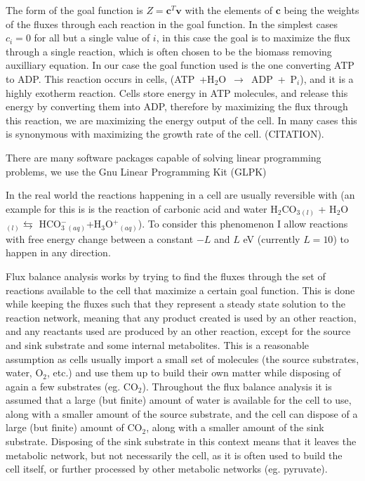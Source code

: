 \documentclass[10pt,a4paper]{article}
\begin{document}
	The form of the goal function is $Z=\mathbf{c}^T \mathbf{v}$ with the elements of $\mathbf{c}$ being the weights of the fluxes through each reaction in the goal function. In the simplest cases $c_i=0$ for all but a single value of $i$, in this case the goal is to maximize the flux through a single reaction, which is often chosen to be the biomass removing auxilliary equation. In our case the goal function used is the one converting ATP to ADP. This reaction occurs in cells, (ATP~+H$_2$O~$\rightarrow$~ADP~+~P$_i$), and it is a highly exotherm reaction. Cells store energy in ATP molecules, and release this energy by converting them into ADP, therefore by maximizing the flux through this reaction, we are maximizing the energy output of the cell. In many cases this is synonymous with maximizing the growth rate of the cell. (CITATION). 
	
	There are many software packages capable of solving linear programming problems, we use the Gnu Linear Programming Kit (GLPK) \cite{glpk}


	In the real world the reactions happening in a cell are usually reversible with (an example for this is is the reaction of carbonic acid and water H$_2$CO$_3$$_{(l)}$ + H$_2$O$_{(l)} \leftrightarrows$ HCO$^-_3$$_{(aq)}$+H$_3$O$^+$$_{(aq)}$). To consider this phenomenon I allow reactions with free energy change between a constant $-L$ and $L$ eV (currently $L=10$) to happen in any direction. 
	
	Flux balance analysis works by trying to find the fluxes through the set of reactions available to the cell that maximize a certain goal function. This is done while keeping the fluxes such that they represent a steady state solution to the reaction network, meaning that any product created is used by an other reaction, and any reactants used are produced by an other reaction, except for the source and sink substrate and some internal metabolites. This is a reasonable assumption as cells usually import a small set of molecules (the source substrates, water, O$_2$, etc.) and use them up to build their own matter while disposing of again a few substrates (eg. CO$_2$). Throughout the flux balance analysis it is assumed that a large (but finite) amount of water is available for the cell to use, along with a smaller amount of the source substrate, and the cell can dispose of a large (but finite) amount of CO$_2$, along with a smaller amount of the sink substrate. Disposing of the sink substrate in this context means that it leaves the metabolic network, but not necessarily the cell, as it is often used to build the cell itself, or further processed by other metabolic networks (eg. pyruvate).
	
\end{document}
